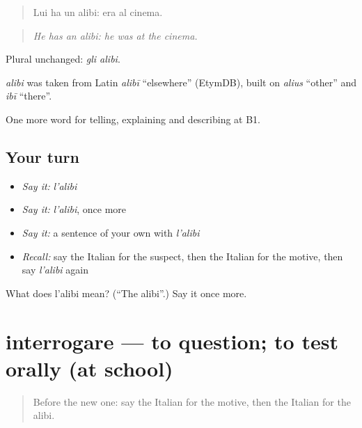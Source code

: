 \begin{quote}
Lui ha un alibi: era al cinema.
\end{quote}

\begin{quote}
\emph{He has an alibi: he was at the cinema.}
\end{quote}

Plural unchanged: \emph{gli alibi}.

\begin{cousinweb}
\emph{alibi} was taken from Latin \emph{alibī} \textquotedblleft{}elsewhere\textquotedblright{} (EtymDB), built on \emph{alius} \textquotedblleft{}other\textquotedblright{} and \emph{ibī} \textquotedblleft{}there\textquotedblright{}.
\end{cousinweb}

\begin{grammarlens}[title={What you've built}]
One more word for telling, explaining and describing at B1.
\end{grammarlens}

\subsection*{Your turn}
\begin{itemize}
\raggedright
  \item \emph{Say it:} \emph{l'alibi}
  \item \emph{Say it:} \emph{l'alibi}, once more
  \item \emph{Say it:} a sentence of your own with \emph{l'alibi}
  \item \emph{Recall:} say the Italian for the suspect, then the Italian for the motive, then say \emph{l'alibi} again
\end{itemize}

\begin{tcolorbox}[breakable,colback=teal!4,colframe=teal!35!black,title={Before you move on}]
What does l'alibi mean? (\textquotedblleft{}The alibi\textquotedblright{}.) Say it once more.
\end{tcolorbox}
\section[interrogare]{interrogare — to question; to test orally (at school)}

\label{lesson:IT-C296-interrogare}



\begin{quote}
Before the new one: say the Italian for the motive, then the Italian for the alibi.
\end{quote}

